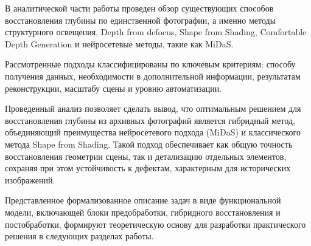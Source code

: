 В аналитической части работы проведен обзор существующих способов восстановления глубины по единственной фотографии, а именно
методы структурного освещения, Depth from defocus, Shape from Shading, Comfortable Depth Generation и нейросетевые методы, такие как MiDaS.

Рассмотренные подходы классифицированы по ключевым критериям:
способу получения данных, необходимости в дополнительной информации, результатам реконструкции, масштабу сцены и уровню автоматизации.

Проведенный анализ позволяет сделать вывод, что оптимальным решением для восстановления глубины из архивных фотографий является гибридный метод,
объединяющий преимущества нейросетевого подхода (MiDaS) и классического метода Shape from Shading.
Такой подход обеспечивает как общую точность восстановления геометрии сцены,
так и детализацию отдельных элементов, сохраняя при этом устойчивость к дефектам, характерным для исторических изображений.

Представленное формализованное описание задач в виде функциональной модели, включающей блоки предобработки,
гибридного восстановления и постобработки, формируют теоретическую основу для разработки практического решения в следующих разделах работы.

